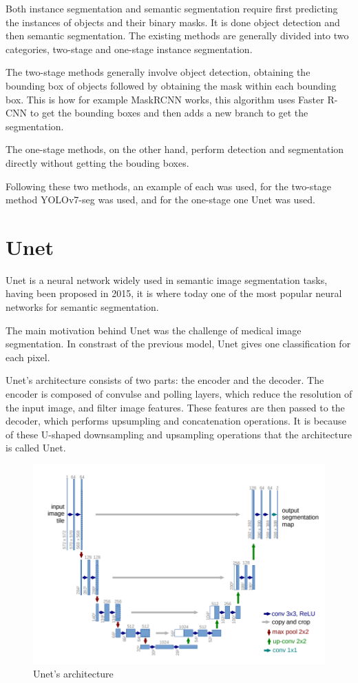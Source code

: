 Both instance segmentation and semantic segmentation require first predicting the instances of objects and their binary masks. It is done object detection and then semantic segmentation. The existing methods are generally divided into two categories\cite{instayolo}, two-stage and one-stage instance segmentation.

The two-stage methods generally involve object detection, obtaining the bounding box of objects followed by obtaining the mask within each bounding box. This is how for example MaskRCNN works, this algorithm uses Faster R-CNN to get the bounding boxes and then adds a new branch to get the segmentation.

The one-stage methods, on the other hand, perform detection and segmentation directly without getting the bouding boxes.

Following these two methods, an example of each was used, for the two-stage method YOLOv7-seg was used, and for the one-stage one Unet was used.




\section{Unet}
Unet is a neural network widely used in semantic image segmentation tasks, having been proposed in 2015, it is where today one of the most popular neural networks for semantic segmentation.

The main motivation behind Unet was the challenge of medical image segmentation\cite{unetpaper}.
In constrast of the previous model, Unet gives one classification for each pixel.

Unet's architecture consists of two parts: the encoder and the decoder. The encoder is composed of convulse and polling layers, which reduce the resolution of the input image, and filter image features. These features are then passed to the decoder, which performs upsumpling and concatenation operations. It is because of these U-shaped downsampling and upsampling operations that the architecture is called Unet.

\begin{figure}[H]
\centering
\includegraphics[width=15cm]{images/unetarquitetura.png}
\caption[Unet's architecture]{Unet's architecture\cite{unetpaper}}
\end{figure}

